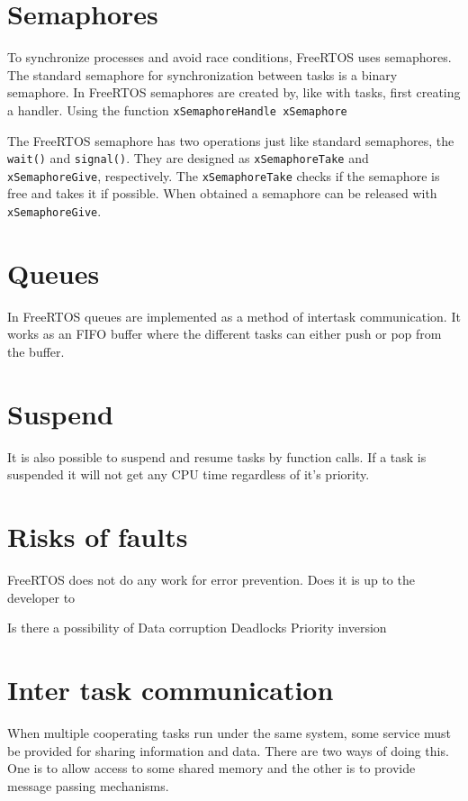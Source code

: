 \section{ Semaphores }

To synchronize processes and avoid race conditions, FreeRTOS uses semaphores. The standard semaphore for synchronization between tasks is a binary semaphore. In FreeRTOS semaphores are created by, like with tasks, first creating a handler. Using the function \texttt{xSemaphoreHandle xSemaphore}

The FreeRTOS semaphore has two operations just like standard semaphores, the \texttt{wait()} and \texttt{signal()}. They are designed as \texttt{xSemaphoreTake} and \texttt{xSemaphoreGive}, respectively. The \texttt{xSemaphoreTake} checks if the semaphore is free and takes it if possible.
When obtained a semaphore can be released with \texttt{xSemaphoreGive}.

\section{ Queues }

In FreeRTOS queues are implemented as a method of intertask communication. It works as an FIFO buffer where the different tasks can either push or pop from the buffer.

\section{ Suspend }
It is also possible to suspend and resume tasks by function calls. If a task is suspended it will not get any CPU time regardless of it's priority.

\section{Risks of faults}

FreeRTOS does not do any work for error prevention. Does it is up to the developer to 

Is there a possibility of 
Data corruption
Deadlocks
Priority inversion



\section{Inter task communication}
When multiple cooperating tasks run under the same system, some service must be
provided for sharing information and data. There are two ways of doing this. One
is to allow access to some shared memory and the other is to provide message
passing mechanisms.

